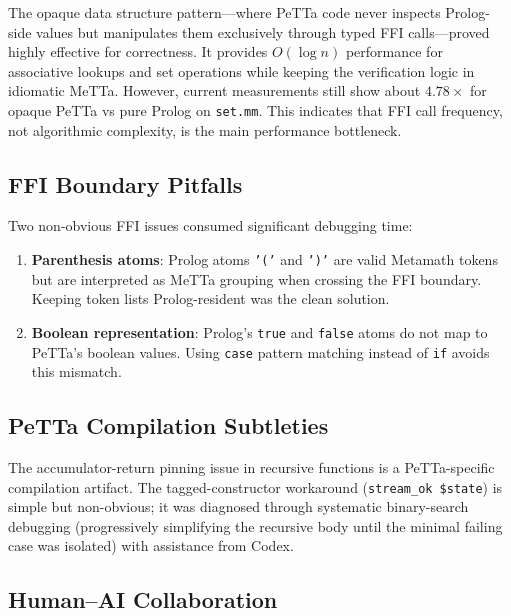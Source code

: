 \documentclass[11pt]{article}
\begin{document}
The opaque data structure pattern---where PeTTa code never inspects
Prolog-side values but manipulates them exclusively through typed
FFI calls---proved highly effective for correctness.  It provides
$O(\log n)$ performance for associative lookups and set operations
while keeping the verification logic in idiomatic MeTTa.
However, current measurements still show about $4.78\times$
for opaque PeTTa vs pure Prolog on \texttt{set.mm}.
This indicates that FFI call frequency, not algorithmic complexity,
is the main performance bottleneck.

\subsection{FFI Boundary Pitfalls}

Two non-obvious FFI issues consumed significant debugging time:
\begin{enumerate}[leftmargin=2em]
  \item \textbf{Parenthesis atoms}: Prolog atoms \texttt{'('}
    and \texttt{')'} are valid Metamath tokens but are interpreted
    as MeTTa grouping when crossing the FFI boundary.  Keeping
    token lists Prolog-resident was the clean solution.
  \item \textbf{Boolean representation}: Prolog's \texttt{true}
    and \texttt{false} atoms do not map to PeTTa's boolean values.
    Using \texttt{case} pattern matching instead of \texttt{if}
    avoids this mismatch.
\end{enumerate}

\subsection{PeTTa Compilation Subtleties}

The accumulator-return pinning issue in recursive functions is a
PeTTa-specific compilation artifact.  The tagged-constructor
workaround (\texttt{stream\_ok \$state}) is simple but non-obvious;
it was diagnosed through systematic binary-search debugging
(progressively simplifying the recursive body until the minimal
failing case was isolated) with assistance from Codex.

\subsection{Human--AI Collaboration}
\end{document}
